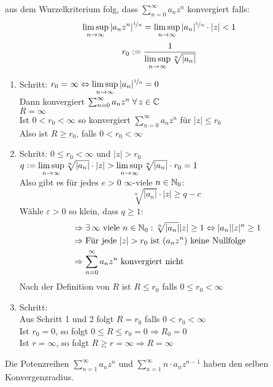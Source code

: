 \documentclass[../ana1u.tex]{subfiles}
\begin{document}
\begin{bew}
	aus dem Wurzelkriterium folg, dass \( \sum_{n=0}^{\infty} a_n z^n\) konvergiert falls:
	\[\limsup\limits_{n\rightarrow\infty} |a_n z^n|^{\nicefrac{1}{n}} 
	= \limsup\limits_{n\rightarrow\infty} |a_n|^{\nicefrac{1}{n}} \cdot |z| < 1 \]
	\[r_0 := \frac{1}{\limsup\limits_{n\rightarrow\infty}\sqrt[n]{|a_n|}} \]
	\begin{enumerate}
		\item Schritt: 
		\(r_0 = \infty \Leftrightarrow \limsup\limits_{n\rightarrow\infty} |a_n|^{\nicefrac{1}{n}} = 0 \) \\
			Dann konvergiert \(\sum_{n=0}^{\infty} a_n z^n \; \forall \, z \in \mathbb{C} \) \\
			\(R = \infty\) \\
			Ist \(0 < r_0 < \infty \) so konvergiert \(\sum_{n=0}^{\infty} a_n z^n \) 
			für \(|z| \leq r_0 \) \\
			Also ist \(R \geq r_0 \), falls \(0 < r_0 < \infty \)
		\item Schritt: \(0 \leq r_0 < \infty \) und \(|z| > r_0 \) \\
			\(q := \limsup\limits_{n\rightarrow\infty}\sqrt[n]{|a_n|} \cdot |z| 
			> \limsup\limits_{n\rightarrow\infty}\sqrt[n]{|a_n|} \cdot r_0 = 1 \) \\
			Also gibt es für jedes \(e > 0\) \(\infty\)-viele \(n \in \mathbb{N}_0 \):
			\[\sqrt[n]{|a_n|} \cdot |z| \geq q - c \]
			Wähle \(\varepsilon > 0 \) so klein, dass \(q \geq 1 \):
			\begin{align*}
				&\Rightarrow \exists \, \infty \text{ viele } n \in \mathbb{N}_0: 
				\sqrt[n]{|a_n|}|z| \geq 1 \Leftrightarrow |a_n||z|^n \geq 1 \\
				&\Rightarrow \text{Für jede } |z| > r_0 \text{ ist } (a_n z^n) 
				\text{ keine Nullfolge} \\
				&\Rightarrow \sum_{n=0}^{\infty} a_n z^n \text{ konvergiert nicht}
			\end{align*}
			Nach der Definition von \(R \) ist \(R \leq r_0 \) falls \(0 \leq r_0 < \infty \)
		\item Schritt: \\
		Aus Schritt 1 und 2 folgt \(R = r_0 \) falls \(0 < r_0 < \infty \) \\
		Ist \(r_0 = 0 \), so folgt \(0 \leq R \leq r_0 = 0 \Rightarrow R_0 = 0 \) \\
		Ist \(r = \infty \), so folgt \(R \geq r = \infty \Rightarrow R = \infty \)
	\end{enumerate}	
\end{bew}
\begin{kor}
	Die Potenzreihen \(\sum_{n=1}^{\infty} a_n z^n \) und 
	\(\sum_{n=1}^{\infty} n \cdot a_n z^{n-1} \) haben den selben Konvergenzradius.
\end{kor}
\end{document}
